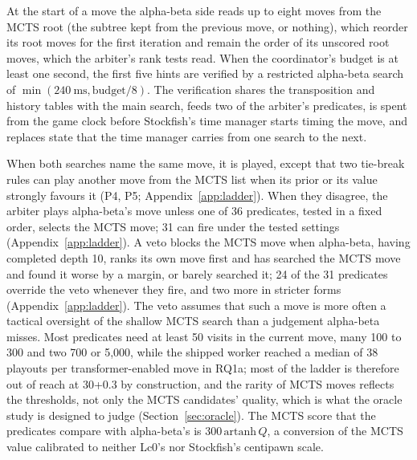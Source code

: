 \documentclass{article}
\begin{document}
At the start of a move the alpha-beta side reads up to eight moves from the MCTS root (the subtree kept from the previous move, or nothing), which reorder its root moves for the first iteration and remain the order of its unscored root moves, which the arbiter's rank tests read. When the coordinator's budget is at least one second, the first five hints are verified by a restricted alpha-beta search of $\min(240~\text{ms}, \text{budget}/8)$. The verification shares the transposition and history tables with the main search, feeds two of the arbiter's predicates, is spent from the game clock before Stockfish's time manager starts timing the move, and replaces state that the time manager carries from one search to the next. %

When both searches name the same move, it is played, except that two tie-break rules can play another move from the MCTS list when its prior or its value strongly favours it (P4, P5; Appendix~\ref{app:ladder}). When they disagree, the arbiter plays alpha-beta's move unless one of 36 predicates, tested in a fixed order, selects the MCTS move; 31 can fire under the tested settings (Appendix~\ref{app:ladder}). A veto blocks the MCTS move when alpha-beta, having completed depth 10, ranks its own move first and has searched the MCTS move and found it worse by a margin, or barely searched it; 24 of the 31 predicates override the veto whenever they fire, and two more in stricter forms (Appendix~\ref{app:ladder}). The veto assumes that such a move is more often a tactical oversight of the shallow MCTS search than a judgement alpha-beta misses. Most predicates need at least 50 visits in the current move, many 100 to 300 and two 700 or 5{,}000, while the shipped worker reached a median of 38 playouts per transformer-enabled move in RQ1a; most of the ladder is therefore out of reach at 30+0.3 by construction, and the rarity of MCTS moves reflects the thresholds, not only the MCTS candidates' quality, which is what the oracle study is designed to judge (Section~\ref{sec:oracle}). The MCTS score that the predicates compare with alpha-beta's is $300\,\mathrm{artanh}\,Q$, a conversion of the MCTS value calibrated to neither Lc0's nor Stockfish's centipawn scale.
\end{document}
